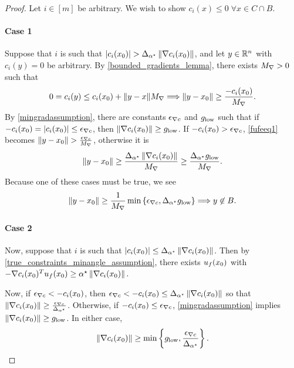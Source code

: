 \begin{proof}
Let $i \in [m]$ be arbitrary.
We wish to show $c_i\left(x\right) \le 0 \; \forall x \in C \cap B$.

\paragraph*{Case 1}
Suppose that $i$ is such that $\left|c_i(x_0)\right| > {\Delta_{\alpha^{\star}}} \left\|\nabla c_i(x_0)\right\|$, and let $y \in \mathbb R^n$ with $c_i(y) = 0$ be arbitrary.
By \cref{bounded_gradients_lemma}, there exists ${M_{\nabla}} > 0$ such that
\begin{align}
\label{fufeeq1}
0 = c_i(y) \le c_i(x_0) + \|y - x\| {M_{\nabla}} \Longrightarrow \|y - x_0\| \ge \frac{-c_i(x_0)}{{M_{\nabla}}}.
\end{align}
By \cref{mingradassumption}, there are constants ${\epsilon_{\nabla c}}$ and ${ g_{\textrm{low}} }$ such that if $-c_i(x_0) = \left|c_i(x_0)\right| \le {\epsilon_{\nabla c}}$, then 
$\| \nabla c_i(x_0) \| \ge { g_{\textrm{low}} }$.
If $-c_i(x_0) > {\epsilon_{\nabla c}}$, \cref{fufeeq1} becomes $\|y - x_0\| > \frac{{\epsilon_{\nabla c}}}{{M_{\nabla}}}$, otherwise it is
\begin{align*}
\|y - x_0\| \ge \frac{{\Delta_{\alpha^{\star}}} \left\|\nabla c_i(x_0)\right\|}{{M_{\nabla}}} \ge \frac{{\Delta_{\alpha^{\star}}} { g_{\textrm{low}} }}{{M_{\nabla}}}.
\end{align*}
Because one of these cases must be true, we see
\begin{align*}
\|y - x_0\| \ge \frac 1 {{M_{\nabla}}}\min\left\{{\epsilon_{\nabla c}}, {\Delta_{\alpha^{\star}}} { g_{\textrm{low}} }\right\} \Longrightarrow y \not \in B.
\end{align*}

\paragraph*{Case 2}
Now, suppose that $i$ is such that 
$\left|c_i(x_0)\right| \le {\Delta_{\alpha^{\star}}} \left\|\nabla c_i(x_0)\right\|$.
Then by \cref{true_constraints_minangle_assumption}, there exists ${u_{f}(x_0)}$ with
$-\nabla c_i(x_0)^T{u_{f}(x_0)} \ge { \alpha^{\star} } \left\| \nabla c_i(x_0) \right\|.$

Now, if ${\epsilon_{\nabla c}} < -c_i(x_0)$, then
${\epsilon_{\nabla c}} < -c_i(x_0) \le {\Delta_{\alpha^{\star}}} \left\|\nabla c_i(x_0)\right\|$
so that 
$\left\|\nabla c_i(x_0)\right\| \ge \frac{{\epsilon_{\nabla c}}}{{\Delta_{\alpha^{\star}}}}$.
Otherwise, if $-c_i(x_0) \le {\epsilon_{\nabla c}}$, \cref{mingradassumption} implies $\left\|\nabla c_i(x_0)\right\| \ge { g_{\textrm{low}} }$.
In either case, \begin{align}
\label{fufeeq2}
\left\|\nabla c_i(x_0)\right\| \ge \min\left\{{ g_{\textrm{low}} }, \frac{{\epsilon_{\nabla c}}}{{\Delta_{\alpha^{\star}}}}\right\}.
\end{align}


\end{proof}
